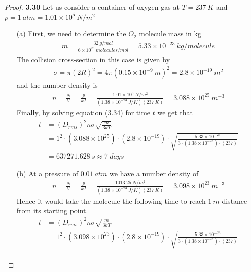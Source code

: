 \documentclass[11pt]{article}
\theoremstyle{definition}
\begin{document}
\begin{proof}{\textbf{3.30}}
    Let us consider a container of oxygen gas at $T = 237~K$ and
    $p = 1~atm = 1.01\times 10^5~N/m^2$
    \begin{itemize}
        \item [(a)] First, we need to determine the $O_2$ molecule mass in kg
        \begin{align*}
            m = \frac{32~g/mol}{6 \times 10^{23}~molecules/mol}
            = 5.33 \times 10^{-23} ~kg/molecule
        \end{align*}
        The collision cross-section in this case is given by
        \begin{align*}
            \sigma = \pi(2R)^2 = 4\pi(0.15 \times 10^{-9}~m)^2
            = 2.8 \times 10^{-19}~m^2
        \end{align*}
        and the number density is
        \begin{align*}
            n = \frac{N}{V} = \frac{p}{kT}
            = \frac{1.01\times 10^5~N/m^2}{(1.38 \times 10^{-23}~J/K)(237~K)}
            = 3.088 \times 10^{25}~m^{-3}
        \end{align*}
        Finally, by solving equation (3.34) for time $t$ we get that
        \begin{align*}
            t &= (D_{rms})^2n\sigma\sqrt{\frac{m}{3kT}}\\
            &=1^2 \cdot (3.088 \times 10^{25})
            \cdot (2.8 \times 10^{-19})
            \cdot \sqrt{\frac{5.33 \times 10^{-23}}{
                3\cdot(1.38 \times 10^{-23})\cdot(237)}}\\
            &= 637271.628~s \approx 7~days
        \end{align*}
        \item [(b)] At a pressure of $0.01~atm$ we have a number density of
        \begin{align*}
            n = \frac{N}{V} = \frac{p}{kT}
            = \frac{1013.25~N/m^2}{(1.38 \times 10^{-23}~J/K)(237~K)}
            = 3.098 \times 10^{23}~m^{-3}
        \end{align*}
        Hence it would take the molecule the following time to reach $1~m$
        distance from its starting point.
        \begin{align*}
            t &= (D_{rms})^2n\sigma\sqrt{\frac{m}{3kT}}\\
            &=1^2 \cdot (3.098 \times 10^{23})
            \cdot (2.8 \times 10^{-19})
            \cdot \sqrt{\frac{5.33 \times 10^{-23}}{
                3\cdot(1.38 \times 10^{-23})\cdot(237)}}\\

\end{align*}
\end{itemize}
\end{proof}
\end{document}
